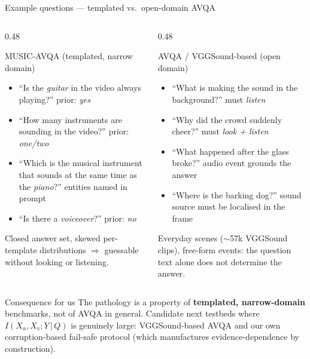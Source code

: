 \documentclass[10pt,aspectratio=169]{beamer}
\begin{document}
\begin{frame}{Example questions --- templated vs.\ open-domain AVQA}

\begin{columns}[T]
\begin{column}{0.48\textwidth}
\begin{block}{MUSIC-AVQA (templated, narrow domain)}
{\footnotesize
\begin{itemize}\setlength\itemsep{2pt}
  \item ``Is the \emph{guitar} in the video always playing?'' \hfill
        \textcolor{paperA}{prior: \emph{yes}}
  \item ``How many instruments are sounding in the video?'' \hfill
        \textcolor{paperA}{prior: \emph{one/two}}
  \item ``Which is the musical instrument that sounds at the same time as the
        \emph{piano}?'' \hfill \textcolor{paperA}{entities named in prompt}
  \item ``Is there a \emph{voiceover}?'' \hfill \textcolor{paperA}{prior: \emph{no}}
\end{itemize}
Closed answer set, skewed per-template distributions $\Rightarrow$ guessable
without looking or listening.}
\end{block}
\end{column}

\begin{column}{0.48\textwidth}
\begin{block}{AVQA / VGGSound-based (open domain)}
{\footnotesize
\begin{itemize}\setlength\itemsep{2pt}
  \item ``What is making the sound in the background?'' \hfill
        \textcolor{paperD}{must \emph{listen}}
  \item ``Why did the crowd suddenly cheer?'' \hfill
        \textcolor{paperD}{must \emph{look + listen}}
  \item ``What happened after the glass broke?'' \hfill
        \textcolor{paperD}{audio event grounds the answer}
  \item ``Where is the barking dog?'' \hfill
        \textcolor{paperD}{sound source must be localised in the frame}
\end{itemize}
Everyday scenes ($\sim$57k VGGSound clips), free-form events: the question text
alone does not determine the answer.}
\end{block}
\end{column}
\end{columns}

\vspace{4pt}
\begin{block}{Consequence for us}
{\footnotesize
The pathology is a property of \textbf{templated, narrow-domain} benchmarks, not
of AVQA in general. Candidate next testbeds where
$I(X_a,X_v;Y\,|\,Q)$ is genuinely large: VGGSound-based AVQA and our own
corruption-based fail-safe protocol (which manufactures evidence-dependence by
construction).}
\end{block}

\end{frame}
\end{document}
